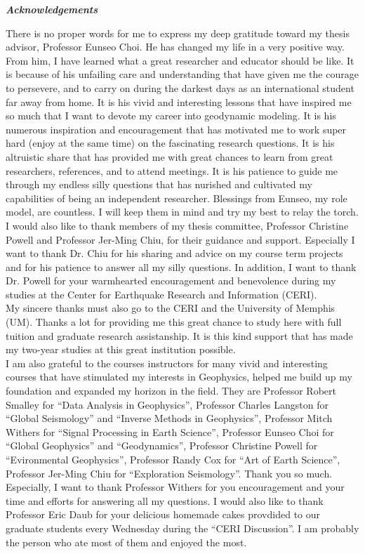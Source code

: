 \begin{center}
\textbf{\textit{Acknowledgements}}
\end{center}

There is no proper words for me to express my deep gratitude toward my thesis advisor, Professor Eunseo Choi. He has changed my life in a very positive way. From him, I have learned what a great researcher and educator should be like. It is because of his unfailing care and understanding that have given me the courage to persevere, and to carry on during the darkest days as an international student far away from home. It is his vivid and interesting lessons that have inspired me so much that I want to devote my career into geodynamic modeling. It is his numerous inspiration and encouragement that has motivated me to work super hard (enjoy at the same time) on the fascinating research questions. It is his altruistic share that has provided me with great chances to learn from great researchers, references, and to attend meetings. It is his patience to guide me through my endless silly questions that has nurished and cultivated my capabilities of being an independent researcher. Blessings from Eunseo, my role model, are countless. I will keep them in mind and try my best to relay the torch.
\\
I would also like to thank members of my thesis committee, Professor Christine Powell and Professor Jer-Ming Chiu, for their guidance and support. Especially I want to thank Dr. Chiu for his sharing and advice on my course term projects and for his patience to answer all my silly questions. In addition, I want to thank Dr. Powell for your warmhearted encouragement and benevolence during my studies at the Center for Earthquake Research and Information (CERI). 
\\
My sincere thanks must also go to the CERI and the University of Memphis (UM). Thanks a lot for providing me this great chance to study here with full tuition and graduate research assistanship. It is this kind support that has made my two-year studies at this great institution possible. 
\\
I am also grateful to the courses instructors for many vivid and interesting courses that have stimulated my interests in Geophysics, helped me build up my foundation and expanded my horizon in the field. They are Professor Robert Smalley for ``Data Analysis in Geophysics'', Professor Charles Langston for ``Global Seismology'' and ``Inverse Methods in Geophysics'', Professor Mitch Withers for ``Signal Processing in Earth Science'', Professor Eunseo Choi for ``Global Geophysics'' and ``Geodynamics'', Professor Christine Powell for ``Evironmental Geophysics'', Professor Randy Cox for ``Art of Earth Science'', Professor Jer-Ming Chiu for ``Exploration Seismology''. Thank you so much. Especially, I want to thank Professor Withers for you encouragement and your time and efforts for answering all my questions. I would also like to thank Professor Eric Daub for your delicious homemade cakes provdided to our graduate students every Wednesday during the ``CERI Discussion''. I am probably the person who ate most of them and enjoyed the most.
